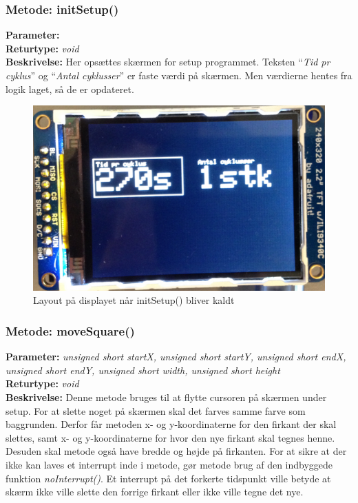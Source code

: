 \subsubsection{Metode: initSetup()}
\textbf{Parameter: } 
\\ \textbf{Returtype: } \textit{void}
\\ \textbf{Beskrivelse: } Her opsættes skærmen for setup programmet. Teksten “\textit{Tid pr cyklus}” og “\textit{Antal cyklusser}” er faste værdi på skærmen. Men værdierne hentes fra logik laget, så de er opdateret. 

\begin{figure}[H]
	\includegraphics[width=\textwidth]{Implementeringsdokument/billeder/setup.png}
	\caption{Layout på displayet når initSetup() bliver kaldt}\label{pic:setup}
\end{figure}

\subsubsection{Metode: moveSquare()}
\textbf{Parameter: } \textit{unsigned short startX, unsigned short startY, unsigned short endX, unsigned short endY, unsigned short width, unsigned short height}
\\ \textbf{Returtype: } \textit{void}
\\ \textbf{Beskrivelse: } Denne metode bruges til at flytte cursoren på skærmen under setup. For at slette noget på skærmen skal det farves samme farve som baggrunden. Derfor får metoden  x- og y-koordinaterne for den firkant der skal slettes, samt x- og y-koordinaterne for hvor den nye firkant skal tegnes henne. Desuden skal metode også have bredde og højde på firkanten. For at sikre at der ikke kan laves et interrupt inde i metode, gør metode brug af den indbyggede funktion \textit{noInterrupt()}. Et interrupt på det forkerte tidspunkt ville betyde at skærm ikke ville slette den forrige firkant eller ikke ville tegne det nye. 

